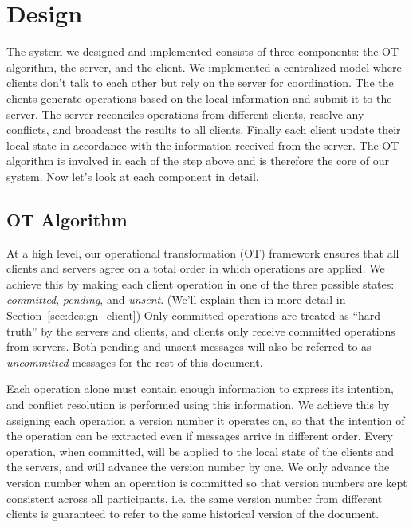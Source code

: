 \section{Design}

The system we designed and implemented consists of three components: the OT
algorithm, the server, and the client. We implemented a centralized model where
clients don't talk to each other but rely on the server for coordination. The
the clients generate operations based on the local information and submit it to
the server. The server reconciles operations from different clients, resolve any
conflicts, and broadcast the results to all clients. Finally each client update
their local state in accordance with the information received from the server.
The OT algorithm is involved in each of the step above and is therefore the core
of our system. Now let's look at each component in detail.

\subsection{OT Algorithm}

At a high level, our operational transformation (OT) framework ensures that all
clients and servers agree on a total order in which operations are applied. We
achieve this by making each client operation in one of the three possible
states: {\em committed}, {\em pending}, and {\em unsent}. (We'll explain then in
more detail in Section~\ref{sec:design_client}) Only committed operations are
treated as ``hard truth'' by the servers and clients, and clients only receive
committed operations from servers. Both pending and unsent messages will also be
referred to as {\em uncommitted} messages for the rest of this document.

Each operation alone must contain enough information to express its intention,
and conflict resolution is performed using this information. We achieve this by
assigning each operation a version number it operates on, so that the intention
of the operation can be extracted even if messages arrive in different order.
Every operation, when committed, will be applied to the local state of the
clients and the servers, and will advance the version number by one. We only
advance the version number when an operation is committed so that version
numbers are kept consistent across all participants, i.e. the same version
number from different clients is guaranteed to refer to the same historical
version of the document.

